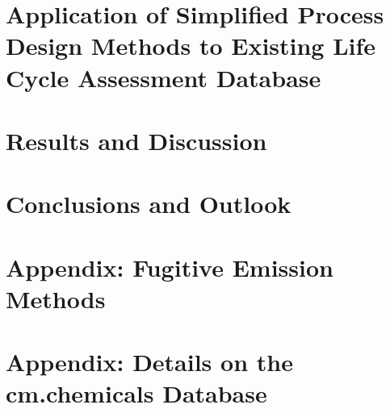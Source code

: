 \chapter{Application of Simplified Process Design Methods to Existing Life Cycle Assessment Database}


\chapter{Results and Discussion}


\chapter{Conclusions and Outlook}



\appendix

\chapter{Appendix: Fugitive Emission Methods}


\chapter{Appendix: Details on the cm.chemicals Database}
\label{appA}




\setlength{\emergencystretch}{3em}
\printbibliography


